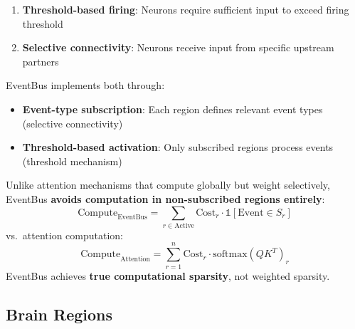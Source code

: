 \documentclass[preprint,12pt]{elsarticle}
\newcommand{\indicator}{\mathbb{1}}
\begin{document}
\begin{enumerate}
\item \textbf{Threshold-based firing}: Neurons require sufficient input to exceed firing threshold
\item \textbf{Selective connectivity}: Neurons receive input from specific upstream partners
\end{enumerate}

EventBus implements both through:

\begin{itemize}
\item \textbf{Event-type subscription}: Each region defines relevant event types (selective connectivity)
\item \textbf{Threshold-based activation}: Only subscribed regions process events (threshold mechanism)
\end{itemize}

Unlike attention mechanisms that compute globally but weight selectively, EventBus \textbf{avoids computation in non-subscribed regions entirely}:
\begin{equation}
\text{Compute}_{\text{EventBus}} = \sum_{r \in \text{Active}} \text{Cost}_r \cdot \indicator[\text{Event} \in S_r]
\end{equation}
vs.\ attention computation:
\begin{equation}
\text{Compute}_{\text{Attention}} = \sum_{r=1}^{n} \text{Cost}_r \cdot \text{softmax}(QK^T)_r
\end{equation}
EventBus achieves \textbf{true computational sparsity}, not weighted sparsity.

\subsection{Brain Regions}
\end{document}

